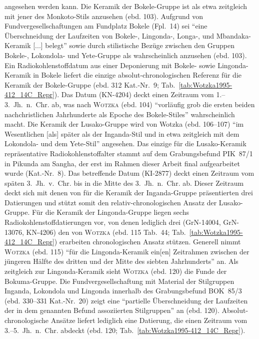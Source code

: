 angesehen werden kann. Die Keramik der Bokele-Gruppe ist als etwa zeitgleich mit jener des Monkoto-Stils anzusehen (ebd. 103). Aufgrund von Fundvergesellschaftungen am Fundplatz Bokele (Fpl.~14) sei \enquote{eine Überschneidung der Laufzeiten von Bokele-, Lingonda-, Longa-, und Mbandaka-Keramik [...] belegt} sowie durch stilistische Bezüge zwischen den Gruppen Bokele-, Lokondola- und Yete-Gruppe als wahrscheinlich anzusehen (ebd. 103). Ein Radiokohlenstoffdatum aus einer Deponierung mit Bokele- sowie Lingonda-Keramik in Bokele liefert die einzige absolut-chronologischen Referenz für die Keramik der Bokele-Gruppe (ebd. 312 Kat.-Nr.~9; Tab.~\ref{tab:Wotzka1995-412_14C_Repr}). Das Datum (KN-4204) deckt einen Zeitraum vom 1.--3.~Jh.~n.~Chr. ab, was nach \textsc{Wotzka} (ebd. 104) \enquote{vorläufig grob die ersten beiden nachchristlichen Jahrhunderte als Epoche des Bokele-Stiles} wahrscheinlich macht. Die Keramik der Lusako-Gruppe wird von Wotzka (ebd. 106--107) \enquote{im Wesentlichen [als] später als der Inganda-Stil und in etwa zeitgleich mit dem Lokondola- und dem Yete-Stil} angesehen. Das einzige für die Lusako-Keramik repräsentative Radiokohlenstoffalter stammt auf dem Grabungsbefund PIK~87/1 in Pikunda am Sangha, der erst im Rahmen dieser Arbeit final aufgearbeitet wurde (Kat.-Nr.~8). Das betreffende Datum (KI-2877) deckt einen Zeitraum vom späten 3.~Jh.~v.~Chr. bis in die Mitte des 3.~Jh.~n.~Chr. ab. Dieser Zeitraum deckt sich mit denen von \textcite[107]{Wotzka.1995} für die Keramik der Inganda-Gruppe präsentierten drei Datierungen und stützt somit den relativ-chronologischen Ansatz der Lusako-Gruppe. Für die Keramik der Lingonda-Gruppe liegen sechs Radiokohlenstoffdatierungen vor, von denen lediglich drei (GrN-14004, GrN-13076, KN-4206) den von \textsc{Wotzka} (ebd. 115 Tab.~44; Tab.~\ref{tab:Wotzka1995-412_14C_Repr}) erarbeiten chronologischen Ansatz stützen. Generell nimmt \textsc{Wotzka} (ebd. 115) \enquote{für die Lingonda-Keramik ein[en] Zeitrahmen zwischen der jüngeren Hälfte des dritten und der Mitte des siebten Jahrhunderts} an. Als zeitgleich zur Lingonda-Keramik sieht \textsc{Wotzka} (ebd. 120) die Funde der Bokuma-Gruppe. Die Fundvergesellschaftung mit Material der Stilgruppen Inganda, Lokondola und Lingonda innerhalb des Grabungsbefund BOK~85/3 (ebd. 330--331 Kat.-Nr.~20) zeigt eine \enquote{partielle Überschneidung der Laufzeiten der in dem genannten Befund assoziierten Stilgruppen} an (ebd. 120). Absolut-chronologische Ansätze liefert lediglich eine Datierung, die einen Zeitraum vom 3.--5.~Jh.~n.~Chr. abdeckt (ebd. 120; Tab.~\ref{tab:Wotzka1995-412_14C_Repr}).

